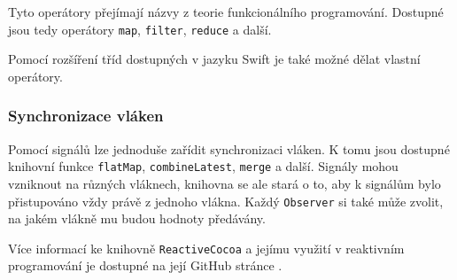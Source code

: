 Tyto operátory přejímají názvy z teorie funkcionálního programování.
Dostupné jsou tedy operátory \texttt{map}, \texttt{filter}, \texttt{reduce} a další.

Pomocí rozšíření tříd dostupných v jazyku Swift je také možné dělat vlastní operátory.

\subsubsection*{Synchronizace vláken}

Pomocí signálů lze jednoduše zařídit synchronizaci vláken.
K tomu jsou dostupné knihovní funkce \texttt{flatMap}, \texttt{combineLatest}, \texttt{merge} a další.
Signály mohou vzniknout na různých vláknech, knihovna se ale stará o to, aby k signálům bylo přistupováno vždy právě z jednoho vlákna.
Každý \texttt{Observer} si také může zvolit, na jakém vlákně mu budou hodnoty předávány.

Více informací ke knihovně \texttt{ReactiveCocoa} a jejímu využití v reaktivním programování je dostupné na její GitHub stránce \cite{github-reactivecocoa}.
